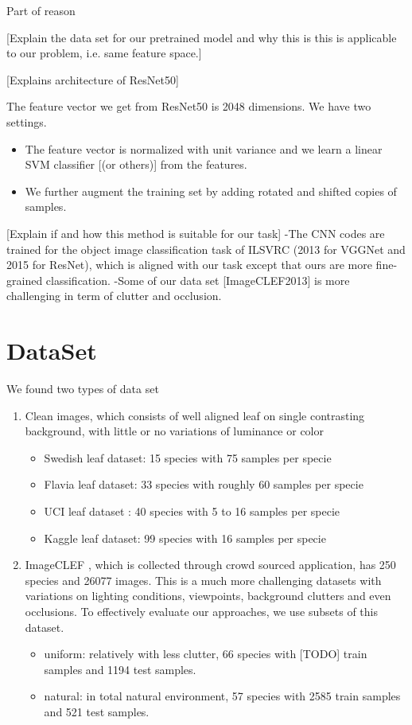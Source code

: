 \documentclass[journal]{IEEEtran}
\begin{document}
Part of reason

[Explain the data set for our pretrained model and why this is this is applicable to our problem, i.e. same feature space.]

[Explains architecture of ResNet50]

The feature vector we get from ResNet50 is 2048 dimensions.
We have two settings.
\begin{itemize}
  \item [--] [explain preprocessing] The feature vector is normalized with unit variance and we learn a linear SVM classifier [(or others)] from the features.
  \item [--] We further augment the training set by adding rotated and shifted copies of samples.
\end{itemize}

[Explain if and how this method is suitable for our task]
-The CNN codes are trained for the object image classification task of ILSVRC (2013 for VGGNet and 2015 for ResNet), which is aligned with our task except that ours are more fine-grained classification.
-Some of our data set [ImageCLEF2013] is more challenging in term of clutter and occlusion.


\section{DataSet}
\label{DataSet}
    We found two types of data set
\begin{enumerate}
  \item Clean images, which consists of well aligned leaf on single contrasting background, with little or no variations of luminance or color
    \begin{itemize}
      \item[--] Swedish leaf dataset\cite{SwedishLeafDataset}: 15 species with 75 samples per specie
      \item[--] Flavia leaf dataset\cite{FlaviaDataset}: 33 species with roughly 60 samples per specie
      \item[--] UCI leaf dataset \cite{UCIDataSet}: 40 species with 5 to 16 samples per specie
      \item[--] Kaggle leaf dataset\cite{Pedro13}: 99 species with 16 samples per specie
    \end{itemize}
  \item ImageCLEF \cite{ImageCLEF2013}, which is collected through crowd sourced application, has 250 species and 26077 images. This is a much more challenging datasets with variations on lighting conditions, viewpoints, background clutters and even occlusions.  To effectively evaluate our approaches, we use subsets of this dataset.
    \begin{itemize}
      \item[--] uniform: relatively with less clutter, 66 species with [TODO] train samples and 1194 test samples.
      \item[--] natural: in total natural environment, 57 species with 2585 train samples and 521 test samples.
    \end{itemize}
\end{enumerate}
\end{document}
